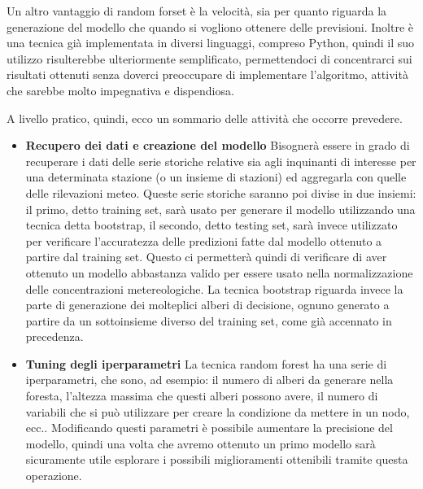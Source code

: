 \documentclass{article}
\begin{document}
Un altro vantaggio di random forset è la velocità, sia per quanto riguarda la generazione del modello che quando si vogliono ottenere delle previsioni. Inoltre è una tecnica già implementata in diversi linguaggi, compreso Python, quindi il suo utilizzo risulterebbe ulteriormente semplificato, permettendoci di concentrarci sui risultati ottenuti senza doverci preoccupare di implementare l'algoritmo, attività che sarebbe molto impegnativa e dispendiosa.

A livello pratico, quindi, ecco un sommario delle attività che occorre prevedere.
\begin{itemize}
\item \textbf{Recupero dei dati e creazione del modello}
Bisognerà essere in grado di recuperare i dati delle serie storiche relative sia agli inquinanti di interesse per una determinata stazione (o un insieme di stazioni) ed aggregarla con quelle delle rilevazioni meteo. Queste serie storiche saranno poi divise in due insiemi: il primo, detto training set, sarà usato per generare il modello utilizzando una tecnica detta bootstrap, il secondo, detto testing set, sarà invece utilizzato per verificare l'accuratezza delle predizioni fatte dal modello ottenuto a partire dal training set. Questo ci permetterà quindi di verificare di aver ottenuto un modello abbastanza valido per essere usato nella normalizzazione delle concentrazioni metereologiche.
La tecnica bootstrap riguarda invece la parte di generazione dei molteplici alberi di decisione, ognuno generato a partire da un sottoinsieme diverso del training set, come già accennato in precedenza.

\item \textbf{Tuning degli iperparametri}
La tecnica random forest ha una serie di iperparametri, che sono, ad esempio: il numero di alberi da generare nella foresta, l'altezza massima che questi alberi possono avere, il numero di variabili che si può utilizzare per creare la condizione da mettere in un nodo, ecc..
Modificando questi parametri è possibile aumentare la precisione del modello, quindi una volta che avremo ottenuto un primo modello sarà sicuramente utile esplorare i possibili miglioramenti ottenibili tramite questa operazione.


\end{itemize}
\end{document}
